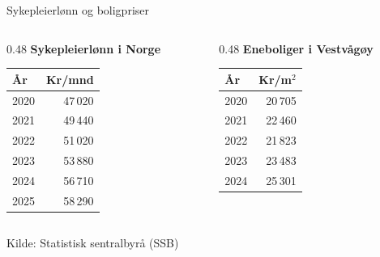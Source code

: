 \documentclass[aspectratio=119,12pt]{beamer}
\begin{document}
\begin{frame}{Sykepleierlønn og boligpriser}

    \begin{columns}[T]

        \begin{column}{0.48\textwidth}
            \centering
            \textbf{Sykepleierlønn i Norge}

            \vspace{0.4cm}

            \begin{tabular}{lr}
                \hline
                \textbf{År} & \textbf{Kr/mnd} \\
                \hline
                2020 & 47\,020 \\
                2021 & 49\,440 \\
                2022 & 51\,020 \\
                2023 & 53\,880 \\
                2024 & 56\,710 \\
                2025 & 58\,290 \\
                \hline
            \end{tabular}
        \end{column}

        \begin{column}{0.48\textwidth}
            \centering
            \textbf{Eneboliger i Vestvågøy}

            \vspace{0.4cm}

            \begin{tabular}{lr}
                \hline
                \textbf{År} & \textbf{Kr/m$^2$} \\
                \hline
                2020 & 20\,705 \\
                2021 & 22\,460 \\
                2022 & 21\,823 \\
                2023 & 23\,483 \\
                2024 & 25\,301 \\
                \hline
            \end{tabular}
        \end{column}

    \end{columns}

    \vspace{0.6cm}

    \begin{center}
        \footnotesize Kilde: Statistisk sentralbyrå (SSB)
    \end{center}

\end{frame}
\end{document}

